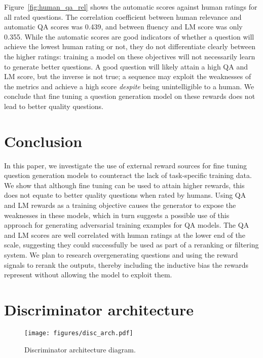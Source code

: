 \documentclass[11pt,a4paper]{article}
\begin{document}
Figure~\ref{fig:human_qa_rel} shows the automatic scores against human ratings for all rated questions. The correlation coefficient between human relevance and automatic QA scores was 0.439, and between fluency and LM score was only 0.355. While the automatic scores are good indicators of whether a question will achieve the lowest human rating or not, they do not differentiate clearly between the higher ratings: training a model on these objectives will not necessarily learn to generate better questions. A good question will likely attain a high QA and LM score, but the inverse is not true; a sequence may exploit the weaknesses of the metrics and achieve a high score \textit{despite} being unintelligible to a human. We conclude that fine tuning a question generation model on these rewards does not lead to better quality questions.


\section{Conclusion}

In this paper, we investigate the use of external reward sources for fine tuning question generation models to counteract the lack of task-specific training data. We show that although fine tuning can be used to attain higher rewards, this does not equate to better quality questions when rated by humans. Using QA and LM rewards as a training objective causes the generator to expose the weaknesses in these models, which in turn suggests a possible use of this approach for generating adversarial training examples for QA models. The QA and LM scores are well correlated with human ratings at the lower end of the scale, suggesting they could successfully be used as part of a reranking or filtering system. We plan to research overgenerating questions and using the reward signals to rerank the outputs, thereby including the inductive bias the rewards represent without allowing the model to exploit them.




\appendix

\section{Discriminator architecture}
\label{sec:discriminator}

\begin{figure}[ht]
\centering
\texttt{[image: figures/disc\_arch.pdf]}
\caption{Discriminator architecture diagram.}
\label{fig:disc_arch}
\end{figure}
\end{document}
